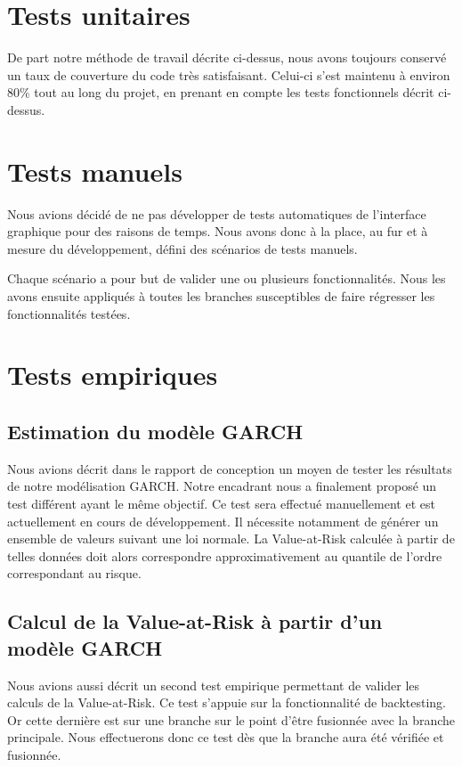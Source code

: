 \documentclass[a4paper,titlepage,french]{report}
\begin{document}
\section{Tests unitaires}

De part notre méthode de travail décrite ci-dessus, nous avons toujours conservé un taux de couverture du code très satisfaisant.
Celui-ci s'est maintenu à environ 80\% tout au long du projet, en prenant en compte les tests fonctionnels décrit ci-dessus.


\section{Tests manuels}

Nous avions décidé de ne pas développer de tests automatiques de l'interface graphique pour des raisons de temps.
Nous avons donc à la place, au fur et à mesure du développement, défini des scénarios de tests manuels.

Chaque scénario a pour but de valider une ou plusieurs fonctionnalités.
Nous les avons ensuite appliqués à toutes les branches susceptibles de faire régresser les fonctionnalités testées.


\section{Tests empiriques}

\subsection{Estimation du modèle GARCH}

Nous avions décrit dans le rapport de conception un moyen de tester les résultats de notre modélisation GARCH. Notre encadrant nous a finalement proposé un test différent ayant le même objectif.
Ce test sera effectué manuellement et est actuellement en cours de développement.
Il nécessite notamment de générer un ensemble de valeurs suivant une loi normale. La Value-at-Risk calculée à partir de telles données doit alors correspondre approximativement au quantile de l'ordre correspondant au risque.

\subsection{Calcul de la Value-at-Risk à partir d'un modèle GARCH}

Nous avions aussi décrit un second test empirique permettant de valider les calculs de la Value-at-Risk.
Ce test s'appuie sur la fonctionnalité de backtesting.
Or cette dernière est sur une branche sur le point d'être fusionnée avec la branche principale.
Nous effectuerons donc ce test dès que la branche aura été vérifiée et fusionnée.
\end{document}

